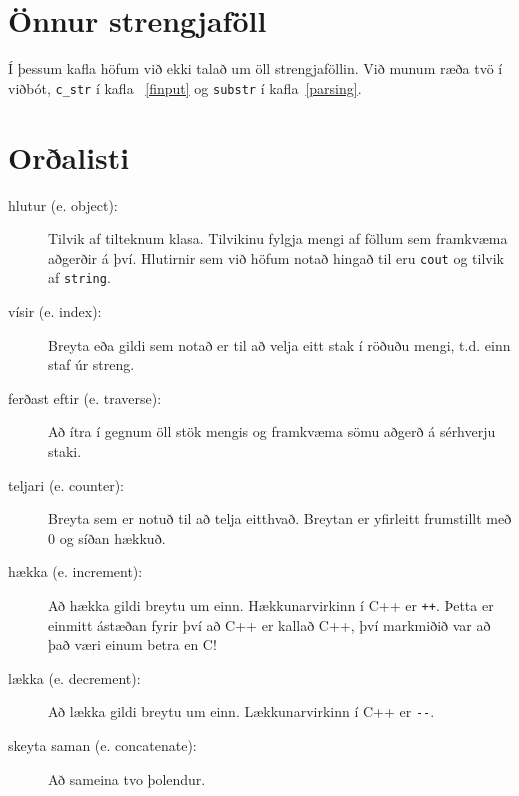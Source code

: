 \section{Önnur strengjaföll}

Í þessum kafla höfum við ekki talað um öll strengjaföllin.
Við munum ræða tvö í viðbót, {\tt c\_str} í kafla ~\ref{finput} og {\tt substr} í kafla~\ref{parsing}.

\section{Orðalisti}

\begin{description}

\item[hlutur (e. object):] Tilvik af tilteknum klasa. Tilvikinu fylgja mengi af föllum sem framkvæma aðgerðir á því.
Hlutirnir sem við höfum notað hingað til eru {\tt cout} og tilvik af {\tt string}.

\item[vísir (e. index):]  Breyta eða gildi sem notað er til að velja eitt stak í röðuðu mengi, t.d. einn staf úr streng.

\item[ferðast eftir (e. traverse):]  Að ítra í gegnum öll stök mengis og framkvæma sömu aðgerð á sérhverju staki.

\item[teljari (e. counter):]  Breyta sem er notuð til að telja eitthvað. Breytan er yfirleitt frumstillt með 0 og síðan hækkuð.

\item[hækka (e. increment):]  Að hækka gildi breytu um einn.
Hækkunarvirkinn í C++ er {\tt ++}.  Þetta er einmitt ástæðan fyrir því að C++ er kallað C++, því markmiðið var að það væri einum betra en C!

\item[lækka (e. decrement):]  Að lækka gildi breytu um einn.
Lækkunarvirkinn í C++ er \verb+--+.

\item[skeyta saman (e. concatenate):] Að sameina tvo þolendur.


\end{description}
